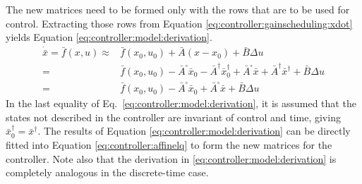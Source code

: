     The new matrices need to be formed only with the rows that are to be used
    for control. Extracting those rows from Equation \eqref{eq:controller:gainscheduling:xdot}
    yields Equation \eqref{eq:controller:model:derivation}.
    \begin{equation}
        \label{eq:controller:model:derivation}
        \begin{array}{rl}
             \dot{\bar{x}} = \bar{f}(x,u) \approx & \bar{f}(x_{0},u_{0}) + \bar{A}(x - x_{0}) + \bar{B}\Delta u \\
             = & \bar{f}(x_{0},u_{0}) - \bar{A}^{\square}\bar{x}_{0} - \bar{A}^{\dagger}\bar{x}^{\dagger}_{0} + \bar{A}^{\square}\bar{x} + \bar{A}^{\dagger}\bar{x}^{\dagger} + \bar{B}\Delta u \\
             = & \bar{f}(x_{0},u_{0}) - \bar{A}^{\square}\bar{x}_{0} + \bar{A}^{\square}\bar{x} + \bar{B}\Delta u
        \end{array}
    \end{equation}
    In the last equality of Eq.~\eqref{eq:controller:model:derivation}, it
    is assumed that the states not described in the controller are invariant
    of control and time, giving $\bar{x}^{\dagger}_{0} = \bar{x}^{\dagger}$.
    The results of Equation \eqref{eq:controller:model:derivation} can be
    directly fitted into Equation \eqref{eq:controller:affinelq} to form
    the new matrices for the controller.
    Note also that the derivation in \eqref{eq:controller:model:derivation} is
    completely analogous in the discrete-time case.

